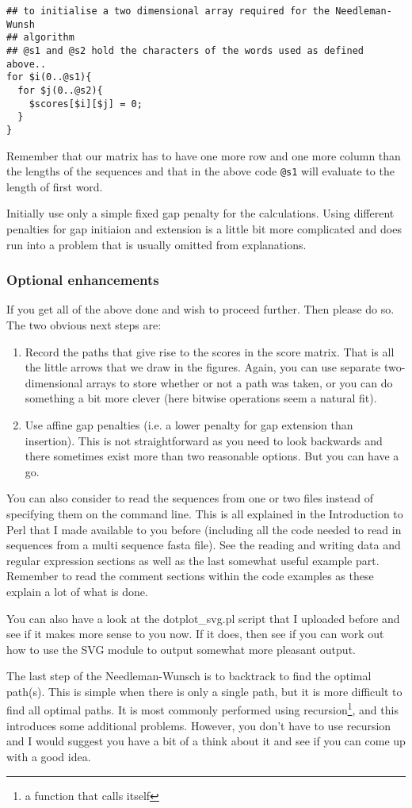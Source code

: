 \documentclass[11pt]{article}
\renewcommand\scriptsize\normalsize
\begin{document}
\begin{verbatim}
## to initialise a two dimensional array required for the Needleman-Wunsh
## algorithm
## @s1 and @s2 hold the characters of the words used as defined above..
for $i(0..@s1){
  for $j(0..@s2){
    $scores[$i][$j] = 0;
  }
}
\end{verbatim}

Remember that our matrix has to have one more row and one more column
than the lengths of the sequences and that in the above code \texttt{@s1}
will evaluate to the length of first word.

Initially use only a simple fixed gap penalty for the calculations. Using
different penalties for gap initiaion and extension is a little bit more
complicated and does run into a problem that is usually omitted from
explanations.

\subsubsection{Optional enhancements}
\label{sec-1-3-5}
If you get all of the above done and wish to proceed further. Then please do so.
The two obvious next steps are:
\begin{enumerate}
\item Record the paths that give rise to the scores in the score matrix. That is
  all the little arrows that we draw in the figures. Again, you can use separate
  two-dimensional arrays to store whether or not a path was taken, or you
  can do something a bit more clever (here bitwise operations seem a natural fit).
\item Use affine gap penalties (i.e. a lower penalty for gap extension than insertion).
  This is not straightforward as you need to look backwards and there sometimes exist
  more than two reasonable options. But you can have a go.
\end{enumerate}

You can also consider to read the sequences from one or two files instead of specifying
them on the command line. This is all explained in the Introduction to Perl that I made
available to you before (including all the code needed to read in sequences from a multi
sequence fasta file). See the reading and writing data and regular expression sections as
well as the last somewhat useful example part. Remember to read the comment sections within
the code examples as these explain a lot of what is done.

You can also have a look at the dotplot\_svg.pl script that I uploaded before and see if it
makes more sense to you now. If it does, then see if you can work out how to use
the SVG module to output somewhat more pleasant output.

The last step of the Needleman-Wunsch is to backtrack to find the optimal path(s). This
is simple when there is only a single path, but it is more difficult to find all optimal
paths. It is most commonly performed using recursion\footnote{a function 
that calls itself}, and this introduces some additional problems. However, you don't have
to use recursion and I would suggest you have a bit of a think about it and see if you 
can come up with a good idea.
\end{document}
